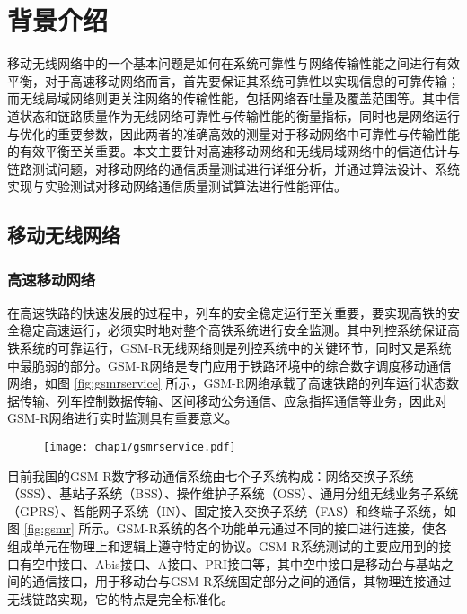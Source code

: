 
\chapter{背景介绍}
\label{chap:background}

移动无线网络中的一个基本问题是如何在系统可靠性与网络传输性能之间进行有效平衡，对于高速移动网络而言，首先要保证其系统可靠性以实现信息的可靠传输；而无线局域网络则更关注网络的传输性能，包括网络吞吐量及覆盖范围等。其中信道状态和链路质量作为无线网络可靠性与传输性能的衡量指标，同时也是网络运行与优化的重要参数，因此两者的准确高效的测量对于移动网络中可靠性与传输性能的有效平衡至关重要。本文主要针对高速移动网络和无线局域网络中的信道估计与链路测试问题，对移动网络的通信质量测试进行详细分析，并通过算法设计、系统实现与实验测试对移动网络通信质量测试算法进行性能评估。

\section{移动无线网络}
\label{sec:mobile}


\subsection{高速移动网络}
\label{sec:gsmr}

在高速铁路的快速发展的过程中，列车的安全稳定运行至关重要，要实现高铁的安全稳定高速运行，必须实时地对整个高铁系统进行安全监测。其中列控系统保证高铁系统的可靠运行，GSM-R无线网络则是列控系统中的关键环节，同时又是系统中最脆弱的部分。GSM-R网络是专门应用于铁路环境中的综合数字调度移动通信网络，如图 \ref{fig:gsmrservice} 所示，GSM-R网络承载了高速铁路的列车运行状态数据传输、列车控制数据传输、区间移动公务通信、应急指挥通信等业务，因此对GSM-R网络进行实时监测具有重要意义。

\begin{figure}[!htp]
\centering
\texttt{[image: chap1/gsmrservice.pdf]}
\end{figure}

目前我国的GSM-R数字移动通信系统由七个子系统构成：网络交换子系统（SSS）、基站子系统（BSS）、操作维护子系统（OSS）、通用分组无线业务子系统（GPRS）、智能网子系统（IN）、固定接入交换子系统（FAS）和终端子系统，如图 \ref{fig:gsmr} 所示。GSM-R系统的各个功能单元通过不同的接口进行连接，使各组成单元在物理上和逻辑上遵守特定的协议。GSM-R系统测试的主要应用到的接口有空中接口、Abis接口、A接口、PRI接口等，其中空中接口是移动台与基站之间的通信接口，用于移动台与GSM-R系统固定部分之间的通信，其物理连接通过无线链路实现，它的特点是完全标准化。

